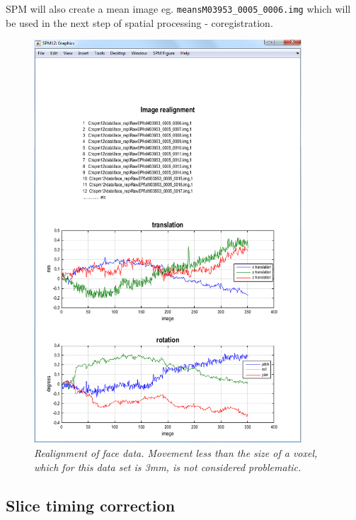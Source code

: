 SPM will also create a mean image eg. 
\verb!meansM03953_0005_0006.img! which will be used in the next
step of spatial processing - coregistration.
\begin{figure}
\begin{center}
\includegraphics[width=100mm]{faces/realign}
\caption{\em Realignment of face data. Movement less than the size of a voxel, which for this data set is 3mm, is not considered problematic. \label{face_realign}}
\end{center}
\end{figure}

\subsection{Slice timing correction}

